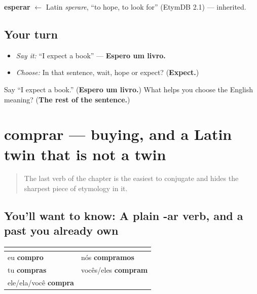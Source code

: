 \begin{cousinweb}
\textbf{esperar} $\leftarrow$ Latin \emph{sperare}, \textquotedblleft{}to hope, to look for\textquotedblright{} (EtymDB 2.1) — inherited.
\end{cousinweb}

\subsection*{Your turn}
\begin{itemize}
\raggedright
  \item \emph{Say it:} “I expect a book” — \textbf{Espero um livro.}
  \item \emph{Choose:} In that sentence, wait, hope or expect? (\textbf{Expect.})
\end{itemize}

\begin{tcolorbox}[breakable,colback=teal!4,colframe=teal!35!black,title={Before you move on}]
Say “I expect a book.” (\textbf{Espero um livro.}) What helps you choose the English meaning? (\textbf{The rest of the sentence.})
\end{tcolorbox}
\section[comprar]{comprar — buying, and a Latin twin that is not a twin}

\label{lesson:PT-C21-comprar}



\begin{quote}
The last verb of the chapter is the easiest to conjugate and hides the sharpest piece of etymology in it.
\end{quote}

\subsection*{You'll want to know: A plain -ar verb, and a past you already own}
\noindent
\begin{tabularx}{\linewidth}{@{}>{\raggedright\arraybackslash}X>{\raggedright\arraybackslash}X@{}}
\toprule
\textbf{} & \textbf{} \\
\midrule
eu \textbf{compro} & nós \textbf{compramos} \\
tu \textbf{compras} & vocês/eles \textbf{compram} \\
ele/ela/você \textbf{compra} &  \\
\bottomrule
\end{tabularx}

